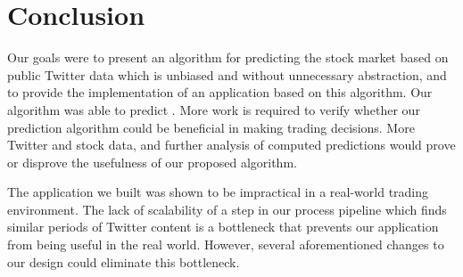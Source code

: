 \documentclass[twocolumn]{article}
\begin{document}
\section{Conclusion}
Our goals were to present an algorithm for predicting the stock market based on public Twitter data which is unbiased and without unnecessary abstraction, and to provide the implementation of an application based on this algorithm. Our algorithm was able to predict . More work is required to verify whether our prediction algorithm could be beneficial in making trading decisions. More Twitter and stock data, and further analysis of computed predictions would prove or disprove the usefulness of our proposed algorithm.

The application we built was shown to be impractical in a real-world trading environment. The lack of scalability of a step in our process pipeline which finds similar periods of Twitter content is a bottleneck that prevents our application from being useful in the real world. However, several aforementioned changes to our design could eliminate this bottleneck.



\end{document}
